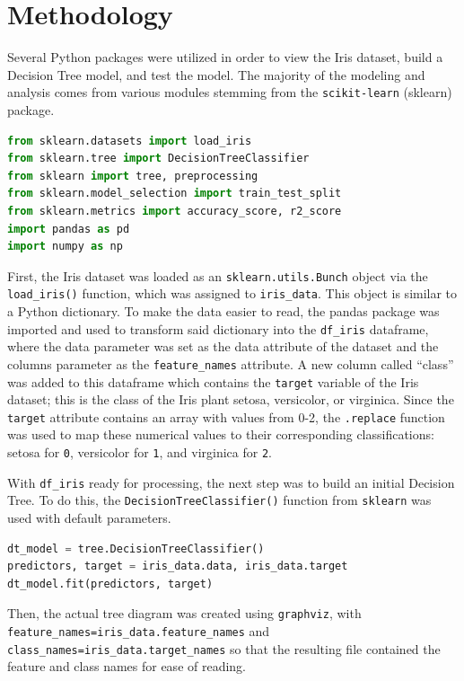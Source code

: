 \documentclass[journal]{IEEEtran}
\begin{document}
\section{Methodology}
Several Python packages were utilized in order to view the Iris dataset, build a Decision Tree model, and test the model. The majority of the modeling and analysis comes from various modules stemming from the \lstinline{scikit-learn} (sklearn) package.

\begin{lstlisting}[language=Python, caption=Libraries used for this assignment.]
from sklearn.datasets import load_iris
from sklearn.tree import DecisionTreeClassifier
from sklearn import tree, preprocessing
from sklearn.model_selection import train_test_split
from sklearn.metrics import accuracy_score, r2_score
import pandas as pd 
import numpy as np
\end{lstlisting}

First, the Iris dataset was loaded as an \lstinline{sklearn.utils.Bunch} object via the \lstinline{load_iris()} function, which was assigned to \lstinline{iris_data}. This object is similar to a Python dictionary. To make the data easier to read, the pandas package was imported and used to transform said dictionary into the \lstinline{df_iris} dataframe, where the data parameter was set as the data attribute of the dataset and the columns parameter as the \lstinline{feature_names} attribute. A new column called “class” was added to this dataframe which contains the \lstinline{target} variable of the Iris dataset; this is the class of the Iris plant \textemdash setosa, versicolor, or virginica. Since the \lstinline{target} attribute contains an array with values from 0-2, the \lstinline{.replace} function was used to map these numerical values to their corresponding classifications: setosa for \lstinline{0}, versicolor for \lstinline{1}, and virginica for \lstinline{2}. 

With \lstinline{df_iris} ready for processing, the next step was to build an initial Decision Tree. To do this, the \lstinline{DecisionTreeClassifier()} function from \lstinline{sklearn} was used with default parameters.

\begin{lstlisting}[language=Python, caption=Building the Decision Tree]
dt_model = tree.DecisionTreeClassifier()
predictors, target = iris_data.data, iris_data.target
dt_model.fit(predictors, target)
\end{lstlisting}

Then, the actual tree diagram was created using \lstinline{graphviz}, with \lstinline{feature_names=iris_data.feature_names} and \lstinline{class_names=iris_data.target_names} so that the resulting file contained the feature and class names for ease of reading. 
\end{document}
